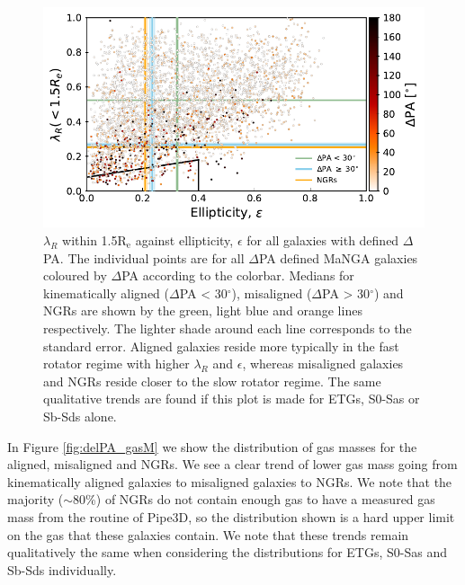 \begin{figure}
    \centering
	\includegraphics[width=\linewidth]{thesis/latex/misalignment_MaNGA/delPA_lambda_Re.pdf}
    \caption{$\lambda_R$ within 1.5$\mathrm{R_e}$ against ellipticity, $\epsilon$ for all galaxies with defined $\Delta$PA. The individual points are for all $\Delta$PA defined MaNGA galaxies coloured by $\Delta$PA according to the colorbar. Medians for kinematically aligned ($\Delta$PA < 30$^{\circ}$), misaligned ($\Delta$PA > 30$^{\circ}$) and NGRs are shown by the green, light blue and orange lines respectively. The lighter shade around each line corresponds to the standard error. Aligned galaxies reside more typically in the fast rotator regime with higher $\lambda_R$ and $\epsilon$, whereas misaligned galaxies and NGRs reside closer to the slow rotator regime. The same qualitative trends are found if this plot is made for ETGs, S0-Sas or Sb-Sds alone.}
    \label{fig:delPA_lambda_Re}
\end{figure}

In Figure \ref{fig:delPA_gasM} we show the distribution of gas masses for the aligned, misaligned and NGRs. We see a clear trend of lower gas mass going from kinematically aligned galaxies to misaligned galaxies to NGRs. We note that the majority ($\sim$80\%) of NGRs do not contain enough gas to have a measured gas mass from the routine of Pipe3D, so the distribution shown is a hard upper limit on the gas that these galaxies contain. We note that these trends remain qualitatively the same when considering the distributions for ETGs, S0-Sas and Sb-Sds individually.

